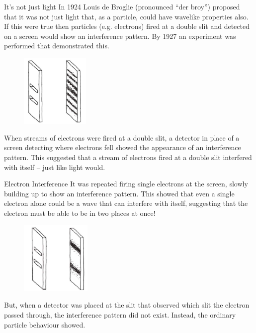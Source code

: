 \documentclass[../Main.tex]{subfiles}
\begin{document}
\begin{frame}{It's not just light}
    In 1924 Louis de Broglie (pronounced ``der broy'') proposed that it was not just light that, as a particle, could have wavelike properties also. If this were true then particles (e.g. electrons) fired at a double slit and detected on a screen would show an interference pattern. By 1927 an experiment was performed that demonstrated this. 
    
    \begin{figure}
        \centering
        \includegraphics[height=3.5cm]{Quantum_Images/electron_as_wave.png}
    \end{figure}
    
    When streams of electrons were fired at a double slit, a detector in place of a screen detecting where electrons fell showed the appearance of an interference pattern. This suggested that a stream of electrons fired at a double slit interfered with itself -- just like light would.
\end{frame}

\begin{frame}{Electron Interference}
    It was repeated firing single electrons at the screen, slowly building up to show an interference pattern. This showed that even a single electron alone could be a wave that can interfere with itself, suggesting that the electron must be able to be in two places at once! \pause
    
    \begin{figure}
        \centering
        \includegraphics[height=3.5cm]{Quantum_Images/electron_as_particle.png}
    \end{figure}
    But, when a detector was placed at the slit that observed which slit the electron passed through, the interference pattern did not exist. Instead, the ordinary particle behaviour showed.
\end{frame}
    
\end{document}
